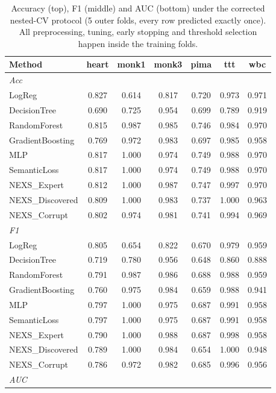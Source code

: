 \begin{table}[t]\centering
\small
\caption{Accuracy (top), F1 (middle) and AUC (bottom) under the corrected nested-CV protocol (5 outer folds, every row predicted exactly once). All preprocessing, tuning, early stopping and threshold selection happen inside the training folds.}
\label{tab:nested-main}
\begin{tabular}{lcccccc}
\toprule
Method & heart & monk1 & monk3 & pima & ttt & wbc \\
\midrule
\multicolumn{7}{l}{\textit{Acc}} \\
LogReg & 0.827 & 0.614 & 0.817 & 0.720 & 0.973 & 0.971 \\
DecisionTree & 0.690 & 0.725 & 0.954 & 0.699 & 0.789 & 0.919 \\
RandomForest & 0.815 & 0.987 & 0.985 & 0.746 & 0.984 & 0.970 \\
GradientBoosting & 0.769 & 0.972 & 0.983 & 0.697 & 0.985 & 0.958 \\
MLP & 0.817 & 1.000 & 0.974 & 0.749 & 0.988 & 0.970 \\
SemanticLoss & 0.817 & 1.000 & 0.974 & 0.749 & 0.988 & 0.970 \\
NEXS\_Expert & 0.812 & 1.000 & 0.987 & 0.747 & 0.997 & 0.970 \\
NEXS\_Discovered & 0.809 & 1.000 & 0.983 & 0.737 & 1.000 & 0.963 \\
NEXS\_Corrupt & 0.802 & 0.974 & 0.981 & 0.741 & 0.994 & 0.969 \\
\midrule
\multicolumn{7}{l}{\textit{F1}} \\
LogReg & 0.805 & 0.654 & 0.822 & 0.670 & 0.979 & 0.959 \\
DecisionTree & 0.719 & 0.780 & 0.956 & 0.648 & 0.860 & 0.888 \\
RandomForest & 0.791 & 0.987 & 0.986 & 0.688 & 0.988 & 0.959 \\
GradientBoosting & 0.760 & 0.975 & 0.984 & 0.659 & 0.988 & 0.941 \\
MLP & 0.797 & 1.000 & 0.975 & 0.687 & 0.991 & 0.958 \\
SemanticLoss & 0.797 & 1.000 & 0.975 & 0.687 & 0.991 & 0.958 \\
NEXS\_Expert & 0.790 & 1.000 & 0.988 & 0.687 & 0.998 & 0.958 \\
NEXS\_Discovered & 0.789 & 1.000 & 0.984 & 0.654 & 1.000 & 0.948 \\
NEXS\_Corrupt & 0.786 & 0.972 & 0.982 & 0.685 & 0.996 & 0.956 \\
\midrule
\multicolumn{7}{l}{\textit{AUC}} \\

\end{tabular}
\end{table}
